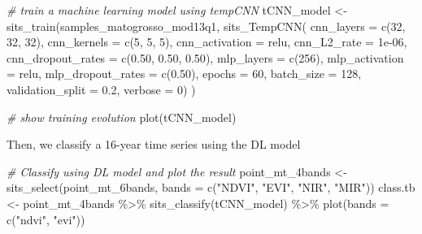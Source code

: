 \documentclass[a4paper,]{tufte-book}
\newenvironment{Shaded}{}{}
\newcommand{\AttributeTok}[1]{\textcolor[rgb]{0.49,0.56,0.16}{#1}}
\newcommand{\CommentTok}[1]{\textcolor[rgb]{0.38,0.63,0.69}{\textit{#1}}}
\newcommand{\DecValTok}[1]{\textcolor[rgb]{0.25,0.63,0.44}{#1}}
\newcommand{\FloatTok}[1]{\textcolor[rgb]{0.25,0.63,0.44}{#1}}
\newcommand{\FunctionTok}[1]{\textcolor[rgb]{0.02,0.16,0.49}{#1}}
\newcommand{\NormalTok}[1]{#1}
\newcommand{\OtherTok}[1]{\textcolor[rgb]{0.00,0.44,0.13}{#1}}
\newcommand{\SpecialCharTok}[1]{\textcolor[rgb]{0.25,0.44,0.63}{#1}}
\newcommand{\StringTok}[1]{\textcolor[rgb]{0.25,0.44,0.63}{#1}}
\begin{document}
\begin{Shaded}
\begin{Highlighting}[]
\CommentTok{\# train a machine learning model using tempCNN}
\NormalTok{tCNN\_model }\OtherTok{\textless{}{-}} \FunctionTok{sits\_train}\NormalTok{(samples\_matogrosso\_mod13q1, }
                       \FunctionTok{sits\_TempCNN}\NormalTok{(}
                          \AttributeTok{cnn\_layers           =} \FunctionTok{c}\NormalTok{(}\DecValTok{32}\NormalTok{, }\DecValTok{32}\NormalTok{, }\DecValTok{32}\NormalTok{),}
                          \AttributeTok{cnn\_kernels          =} \FunctionTok{c}\NormalTok{(}\DecValTok{5}\NormalTok{, }\DecValTok{5}\NormalTok{, }\DecValTok{5}\NormalTok{),}
                          \AttributeTok{cnn\_activation       =} \StringTok{\textquotesingle{}relu\textquotesingle{}}\NormalTok{,}
                          \AttributeTok{cnn\_L2\_rate          =} \FloatTok{1e{-}06}\NormalTok{,}
                          \AttributeTok{cnn\_dropout\_rates    =} \FunctionTok{c}\NormalTok{(}\FloatTok{0.50}\NormalTok{, }\FloatTok{0.50}\NormalTok{, }\FloatTok{0.50}\NormalTok{),}
                          \AttributeTok{mlp\_layers           =} \FunctionTok{c}\NormalTok{(}\DecValTok{256}\NormalTok{),}
                          \AttributeTok{mlp\_activation       =} \StringTok{\textquotesingle{}relu\textquotesingle{}}\NormalTok{,}
                          \AttributeTok{mlp\_dropout\_rates    =} \FunctionTok{c}\NormalTok{(}\FloatTok{0.50}\NormalTok{),}
                          \AttributeTok{epochs               =} \DecValTok{60}\NormalTok{,}
                          \AttributeTok{batch\_size           =} \DecValTok{128}\NormalTok{,}
                          \AttributeTok{validation\_split     =} \FloatTok{0.2}\NormalTok{,}
                          \AttributeTok{verbose              =} \DecValTok{0}\NormalTok{) )}

\CommentTok{\# show training evolution}
\FunctionTok{plot}\NormalTok{(tCNN\_model)}
\end{Highlighting}
\end{Shaded}

Then, we classify a 16-year time series using the DL model

\begin{Shaded}
\begin{Highlighting}[]
\CommentTok{\# Classify using DL model and plot the result}
\NormalTok{point\_mt\_4bands }\OtherTok{\textless{}{-}} \FunctionTok{sits\_select}\NormalTok{(point\_mt\_6bands, }
                               \AttributeTok{bands =} \FunctionTok{c}\NormalTok{(}\StringTok{"NDVI"}\NormalTok{, }\StringTok{"EVI"}\NormalTok{, }\StringTok{"NIR"}\NormalTok{, }\StringTok{"MIR"}\NormalTok{))}
\NormalTok{class.tb }\OtherTok{\textless{}{-}}\NormalTok{ point\_mt\_4bands }\SpecialCharTok{\%\textgreater{}\%} 
    \FunctionTok{sits\_classify}\NormalTok{(tCNN\_model) }\SpecialCharTok{\%\textgreater{}\%} 
    \FunctionTok{plot}\NormalTok{(}\AttributeTok{bands =} \FunctionTok{c}\NormalTok{(}\StringTok{"ndvi"}\NormalTok{, }\StringTok{"evi"}\NormalTok{))}
\end{Highlighting}
\end{Shaded}
\end{document}
